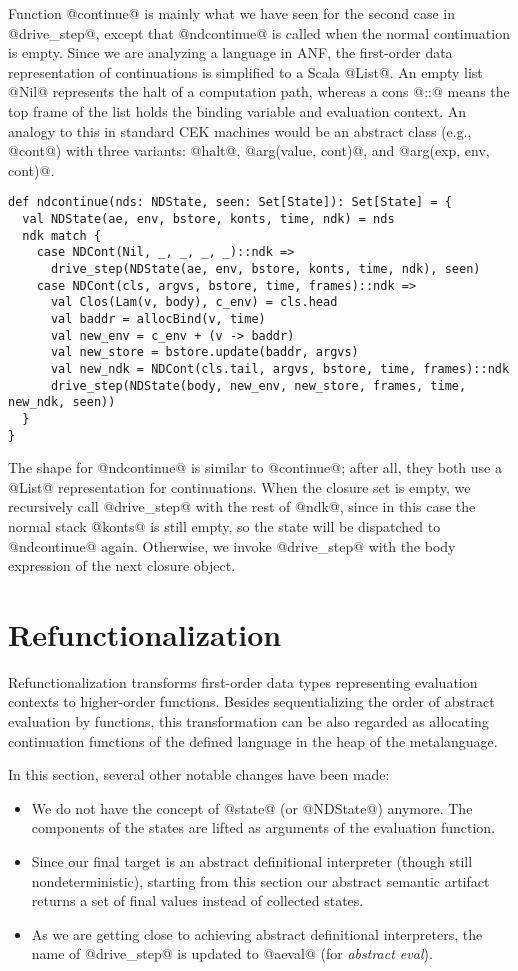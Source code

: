 \documentclass[acmsmall]{acmart}\settopmatter{}
\begin{document}
Function @continue@ is mainly what we have seen for the second case in
@drive_step@, except that @ndcontinue@ is called when
the normal continuation is empty.
Since we are analyzing a language in ANF, the first-order data representation of
continuations is simplified to a Scala @List@.
An empty list @Nil@ represents the halt of a computation path, whereas
a cons @::@ means the top frame of the list holds the binding variable and
evaluation context.
An analogy to this in standard CEK machines would be an abstract class (e.g., @cont@) with
three variants: @halt@, @arg(value, cont)@, and @arg(exp, env, cont)@.

\begin{lstlisting}
def ndcontinue(nds: NDState, seen: Set[State]): Set[State] = {
  val NDState(ae, env, bstore, konts, time, ndk) = nds
  ndk match {
    case NDCont(Nil, _, _, _, _)::ndk =>
      drive_step(NDState(ae, env, bstore, konts, time, ndk), seen)
    case NDCont(cls, argvs, bstore, time, frames)::ndk =>
      val Clos(Lam(v, body), c_env) = cls.head
      val baddr = allocBind(v, time)
      val new_env = c_env + (v -> baddr)
      val new_store = bstore.update(baddr, argvs)
      val new_ndk = NDCont(cls.tail, argvs, bstore, time, frames)::ndk
      drive_step(NDState(body, new_env, new_store, frames, time, new_ndk, seen))
  }
}
\end{lstlisting}

The shape for @ndcontinue@ is similar to @continue@; after
all, they both use a @List@ representation for continuations.
When the closure set is empty, we recursively call @drive_step@ with the rest
of @ndk@, since in this case the normal stack @konts@ is still empty, so
the state will be dispatched to @ndcontinue@ again.
Otherwise, we invoke @drive_step@ with the body expression of the next closure object.

\section{Refunctionalization} \label{sec:refunc}

Refunctionalization transforms first-order data types representing
evaluation contexts to higher-order functions.
Besides sequentializing the order of abstract evaluation by functions,
this transformation can be also regarded as allocating continuation functions of
the defined language in the heap of the metalanguage.

In this section, several other notable changes have been made:
\begin{itemize}
\item We do not have the concept of @state@ (or @NDState@) anymore.
The components of the states are lifted as arguments of the evaluation
function.
\item Since our final target is an abstract definitional interpreter (though still
nondeterministic), starting from this section our abstract semantic artifact
returns a set of final values instead of collected states.
\item As we are getting close to achieving
abstract definitional interpreters, the name of @drive_step@ is updated to
@aeval@ (for \emph{abstract eval}).
\end{itemize}
\end{document}
